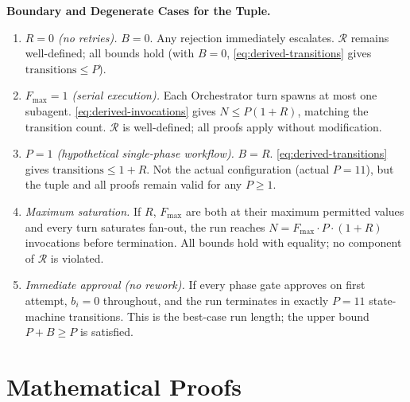 \documentclass[12pt]{article}
\theoremstyle{definition}
\begin{document}
\medskip
\noindent\textbf{Boundary and Degenerate Cases for the Tuple.}

\begin{enumerate}
  \item \emph{$R = 0$ (no retries).}
        $B = 0$.  Any rejection immediately escalates.
        $\mathcal{R}$ remains well-defined; all bounds hold (with
        $B = 0$, \eqref{eq:derived-transitions} gives
        $\text{transitions} \leq P$).

  \item \emph{$F_{\max} = 1$ (serial execution).}
        Each Orchestrator turn spawns at most one subagent.
        \eqref{eq:derived-invocations} gives
        $N \leq P(1+R)$, matching the transition count.
        $\mathcal{R}$ is well-defined; all proofs apply without
        modification.

  \item \emph{$P = 1$ (hypothetical single-phase workflow).}
        $B = R$.
        \eqref{eq:derived-transitions} gives
        $\text{transitions} \leq 1 + R$.
        Not the actual configuration (actual $P = 11$), but the
        tuple and all proofs remain valid for any $P \geq 1$.

  \item \emph{Maximum saturation.}
        If $R$, $F_{\max}$ are both at their maximum permitted
        values and every turn saturates fan-out, the run reaches
        $N = F_{\max} \cdot P \cdot (1+R)$ invocations before
        termination.  All bounds hold with equality; no
        component of $\mathcal{R}$ is violated.

  \item \emph{Immediate approval (no rework).}
        If every phase gate approves on first attempt, $b_i = 0$
        throughout, and the run terminates in exactly $P = 11$
        state-machine transitions.  This is the best-case run
        length; the upper bound $P + B \geq P$ is satisfied.
\end{enumerate}

\section{Mathematical Proofs}
\label{sec:proofs}

\end{document}
